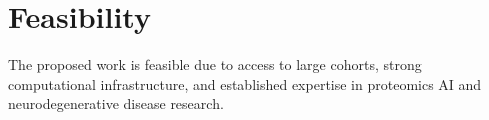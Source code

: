 \section{Feasibility}

The proposed work is feasible due to access to large cohorts, strong
computational infrastructure, and established expertise in proteomics
AI and neurodegenerative disease research.

